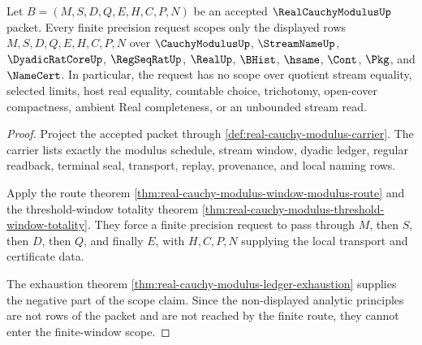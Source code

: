 \begin{theorem}
\label{thm:real-cauchy-modulus-window-scope}
Let $B=(M,S,D,Q,E,H,C,P,N)$ be an accepted $\RealCauchyModulusUp$ packet. Every finite precision request scopes only the displayed rows $M,S,D,Q,E,H,C,P,N$ over $\CauchyModulusUp$, $\StreamNameUp$, $\DyadicRatCoreUp$, $\RegSeqRatUp$, $\RealUp$, $\BHist$, $\hsame$, $\Cont$, $\Pkg$, and $\NameCert$. In particular, the request has no scope over quotient stream equality, selected limits, host real equality, countable choice, trichotomy, open-cover compactness, ambient Real completeness, or an unbounded stream read.
\end{theorem}
\begin{proof}
Project the accepted packet through \autoref{def:real-cauchy-modulus-carrier}. The carrier lists exactly the modulus schedule, stream window, dyadic ledger, regular readback, terminal seal, transport, replay, provenance, and local naming rows.

Apply the route theorem \autoref{thm:real-cauchy-modulus-window-modulus-route} and the threshold-window totality theorem \autoref{thm:real-cauchy-modulus-threshold-window-totality}. They force a finite precision request to pass through $M$, then $S$, then $D$, then $Q$, and finally $E$, with $H,C,P,N$ supplying the local transport and certificate data.

The exhaustion theorem \autoref{thm:real-cauchy-modulus-ledger-exhaustion} supplies the negative part of the scope claim. Since the non-displayed analytic principles are not rows of the packet and are not reached by the finite route, they cannot enter the finite-window scope.
\end{proof}


